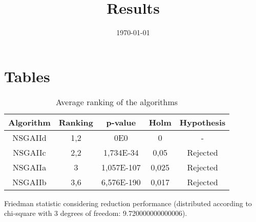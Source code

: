 \documentclass{article}
\title{Results}
\author{}
\date{\today}
\begin{document}
\oddsidemargin 0in \topmargin 0in\maketitle

\section{Tables}
\begin{table}[!htp]
\centering
\begin{tabular}{c|c|c|c|c}
Algorithm&Ranking&p-value&Holm&Hypothesis\\
\hline
NSGAIId & 1,2 & 0E0 & 0 & -\\
NSGAIIc & 2,2 & 1,734E-34 & 0,05 & Rejected\\
NSGAIIa & 3 & 1,057E-107 & 0,025 & Rejected\\
NSGAIIb & 3,6 & 6,576E-190 & 0,017 & Rejected\\
\end{tabular}
\caption{Average ranking of the algorithms}
\end{table}


Friedman statistic considering reduction performance (distributed according to chi-square with 3 degrees of freedom: 9.720000000000006).
\end{document}
